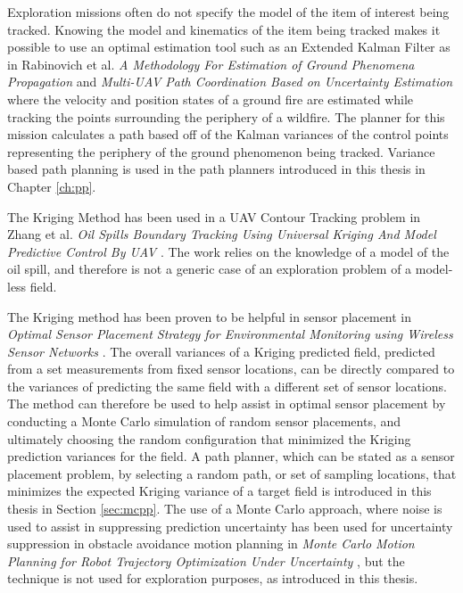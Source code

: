 Exploration missions often do not specify the model of the item of interest being tracked. Knowing the model and kinematics of the item being tracked makes it possible to use an optimal estimation tool such as an Extended Kalman Filter as in Rabinovich et al. \textit{A Methodology For Estimation of Ground Phenomena Propagation} \cite{sharon:uav_est} and \textit{Multi-UAV Path Coordination Based on Uncertainty Estimation} \cite{sharon:uav_uncert} where the velocity and position states of a ground fire are estimated while tracking the points surrounding the periphery of a wildfire. The planner for this mission calculates a path based off of the Kalman variances of the control points representing the periphery of the ground phenomenon being tracked. Variance based path planning is used in the path planners introduced in this thesis in Chapter \ref{ch:pp}.

The Kriging Method has been used in a UAV Contour Tracking problem in Zhang et al. \textit{Oil Spills Boundary Tracking Using Universal Kriging And Model Predictive Control By UAV} \cite{zhang:oil_krig}. The work relies on the knowledge of a model of the oil spill, and therefore is not a generic case of an exploration problem of a model-less field.

The Kriging method has been proven to be helpful in sensor placement in \textit{Optimal Sensor Placement Strategy for Environmental Monitoring using Wireless Sensor Networks} \cite{kriging:sensorplacement}. The overall variances of a Kriging predicted field, predicted from a set measurements from fixed sensor locations, can be directly compared to the variances of predicting the same field with a different set of sensor locations. The method can therefore be used to help assist in optimal sensor placement by conducting a Monte Carlo simulation of random sensor placements, and ultimately choosing the random configuration that minimized the Kriging prediction variances for the field. A path planner, which can be stated as a sensor placement problem, by selecting a random path, or set of sampling locations, that minimizes the expected Kriging variance of a target field is introduced in this thesis in Section \ref{sec:mcpp}. The use of a Monte Carlo approach, where noise is used to assist in suppressing prediction uncertainty has been used for uncertainty suppression in obstacle avoidance motion planning in \textit{Monte Carlo Motion Planning for Robot Trajectory Optimization Under Uncertainty} \cite{janson:mcmp}, but the technique is not used for exploration purposes, as introduced in this thesis.

